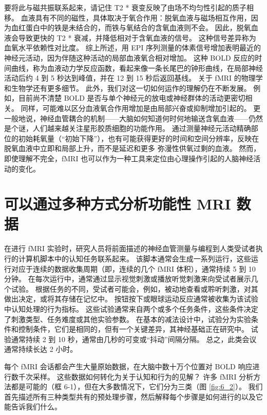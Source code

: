 要将此与磁共振联系起来，请记住 T2 * 衰变反映了由场不均匀性引起的质子相移。 
血液具有不同的磁性，具体取决于氧合作用：脱氧血液与磁场相互作用，因为血红蛋白中的铁是未结合的，而铁与氧结合的含氧血液则不会。
因此，脱氧血液会导致更快的 T2 * 衰减，并降低相对于含氧血液的信号。
这种信号差异称为血氧水平依赖性对比度。 
综上所述，用 EPI 序列测量的体素信号增加表明最近的神经元活动，因为伴随这种活动的局部血液氧合相对增加。
这种 BOLD 反应的时间曲线，称为血液动力学反应函数，看起来像一条长尾巴的钟形曲线，在局部神经活动后约 4 到 5 秒达到峰值，并在 12 到 15 秒后返回基线。
关于 fMRI 的物理学和生物学还有更多细节。 
此外，我们对这一切如何运作的理解仍在不断发展。 
例如，目前尚不清楚 BOLD 是否与单个神经元的放电或神经群体的活动更密切相关。 
同样，可能难以区分血液氧合作用增加是由局部兴奋或抑制增加引起的。 
更一般地说，神经血管耦合的机制——大脑如何知道何时何地输送含氧血液——仍然是个谜，人们越来越关注星形胶质细胞的功能作用。 
通过测量神经元活动精确部位的初始耗氧量（“初始下降”），也有可能获得更好的时间和空间分辨率，反映在脱氧血液中立即和局部上升，而不是延迟和更多 弥漫性供氧过剩的血液。 
然而，即使理解不完全，fMRI 也可以作为一种工具来定位由心理操作引起的人脑神经活动的变化。


\section{可以通过多种方式分析功能性 MRI 数据}
在进行 fMRI 实验时，研究人员将前面描述的神经血管测量与编程到人类受试者执行的计算机脚本中的认知任务联系起来。 
该脚本通常会生成一系列运行，这些运行对应于连续的数据收集周期（即，连续的几个 fMRI 体积），通常持续 5 到 10 分钟。 
在每次运行中，通常通过显示视觉刺激或播放听觉刺激来向受试者展示几个试验。 
根据任务的不同，受试者可能会，例如，被动地查看或聆听刺激，对其做出决定，或将其存储在记忆中。 
按钮按下或眼球运动反应通常被收集为该试验中认知处理的行为指标。 
这些试验通常来自两个或多个任务条件，这些条件决定了刺激类型、任务难度或其他实验参数。 
在基本的减法设计中，试验分为实验条件和控制条件，它们是相同的，但有一个关键差异，其神经基础正在研究中。 
试验通常持续 2 到 10 秒，通常由几秒的可变或“抖动”间隔分隔。 
总之，此类会议通常持续长达 2 小时。


每个 fMRI 会话都会产生大量原始数据，在大脑中数十万个位置对 BOLD 响应进行数千次采样。 
这些数据如何转化为关于认知和行为的见解？ 
许多 fMRI 分析方法都是可能的（框 6-1），但在大多数情况下，它们分为三类（图 \ref{fig:6_2}）。 
我们首先描述所有三种类型共有的预处理步骤，然后解释每个步骤是如何进行的以及它能告诉我们什么。



